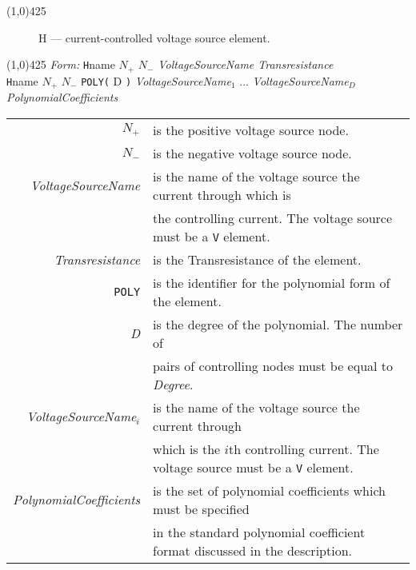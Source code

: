 
\oddsidemargin 10mm \topmargin 0.0in \textwidth 5.5in \textheight 7.375in
\evensidemargin 1.0in \headheight 0.18in \footskip 0.16in
%
\section[H \- Current-Controlled Voltage Source]{}
\linethickness{1mm}
\line(1,0){425}
\normalsize
\begin{figure}[h]
\centerline{\epsfxsize=2.5in} \caption{H ---
current-controlled voltage source element.}
\end{figure}
\linethickness{0.5mm} \line(1,0){425}
\newline
\textit{Form:}
\newline
 {\tt H}name $N_{+}$ $N_{-}$ {\it VoltageSourceName Transresistance}\\
     {\tt H}name $N_{+}$ $N_{-}$ {\tt POLY(} D {\tt )}
     {\it VoltageSourceName}$_1$ ... {\it VoltageSourceName}$_D$ {\it
     PolynomialCoefficients}
\newline
\begin{tabular}{r l}
$N_{+}$ & is the positive voltage source node.\\
$N_{-}$ & is the negative voltage source node.\\
{\it VoltageSourceName} & is the name of the voltage source the
current through which is \\
& the controlling current. The voltage source must be a {\tt V} element.\\
{\it Transresistance} & is the Transresistance of the element.\\
{\tt POLY} & is the identifier for the polynomial form of the
element.\\
{\it D} & is the degree of the polynomial. The number of\\
& pairs of controlling nodes must be equal to {\it Degree}.\\
{\it VoltageSourceName$_i$} & is the name of the voltage source
the current through \\
& which is the $i$th controlling current. The voltage source must be a {\tt V} element.\\
{\it PolynomialCoefficients} & is the set of polynomial
coefficients which must be specified\\
& in the standard polynomial coefficient format discussed in the
description.
\end{tabular}

